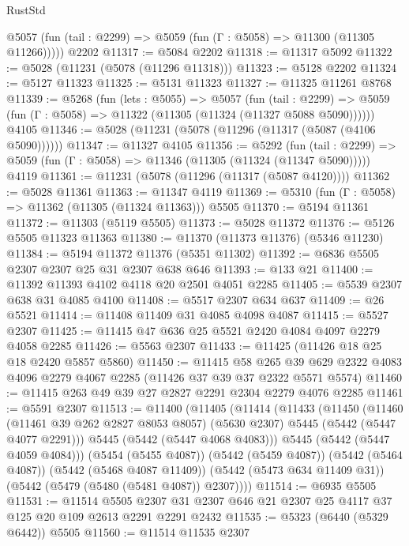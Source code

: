 \begin{lexlean}{RustStd}
\begin{coremodule}
      @5057 (fun (tail : @2299) => @5059 (fun (Γ : @5058) => @11300 (@11305 @11266)))))
    @2202
@11317 := @5084 @2202
@11318 := @11317 @5092
@11322 := @5028 (@11231 (@5078 (@11296 @11318)))
@11323 := @5128 @2202
@11324 := @5127 @11323
@11325 := @5131 @11323
@11327 := @11325 @11261 @8768
@11339 := @5268
    (fun (lets : @5055) =>
    @5057
      (fun (tail : @2299) =>
      @5059 (fun (Γ : @5058) => @11322 (@11305 (@11324 (@11327 @5088 @5090))))))
    @4105
@11346 := @5028 (@11231 (@5078 (@11296 (@11317 (@5087 (@4106 @5090))))))
@11347 := @11327 @4105
@11356 := @5292
    (fun (tail : @2299) => @5059 (fun (Γ : @5058) => @11346 (@11305 (@11324 (@11347 @5090)))))
    @4119
@11361 := @11231 (@5078 (@11296 (@11317 (@5087 @4120))))
@11362 := @5028 @11361
@11363 := @11347 @4119
@11369 := @5310 (fun (Γ : @5058) => @11362 (@11305 (@11324 @11363))) @5505
@11370 := @5194 @11361
@11372 := @11303 (@5119 @5505)
@11373 := @5028 @11372
@11376 := @5126 @5505 @11323 @11363
@11380 := @11370 (@11373 @11376) (@5346 @11230)
@11384 := @5194 @11372 @11376 (@5351 @11302)
@11392 := @6836 @5505 @2307 @2307 @25 @31 @2307 @638 @646
@11393 := @133 @21
@11400 := @11392 @11393 @4102 @4118 @20 @2501 @4051 @2285
@11405 := @5539 @2307 @638 @31 @4085 @4100
@11408 := @5517 @2307 @634 @637
@11409 := @26 @5521
@11414 := @11408 @11409 @31 @4085 @4098 @4087
@11415 := @5527 @2307
@11425 := @11415 @47 @636 @25 @5521 @2420 @4084 @4097 @2279 @4058 @2285
@11426 := @5563 @2307
@11433 := @11425 (@11426 @18 @25 @18 @2420 @5857 @5860)
@11450 := @11415
    @58
    @265
    @39
    @629
    @2322
    @4083
    @4096
    @2279
    @4067
    @2285
    (@11426 @37 @39 @37 @2322 @5571 @5574)
@11460 := @11415 @263 @49 @39 @27 @2827 @2291 @2304 @2279 @4076 @2285
@11461 := @5591 @2307
@11513 := @11400
    (@11405
      (@11414
        (@11433
          (@11450
            (@11460
              (@11461 @39 @262 @2827 @8053 @8057)
              (@5630 @2307)
              @5445
              (@5442 (@5447 @4077 @2291)))
            @5445
            (@5442 (@5447 @4068 @4083)))
          @5445
          (@5442 (@5447 @4059 @4084)))
        (@5454 (@5455 @4087))
        (@5442 (@5459 @4087))
        (@5442 (@5464 @4087))
        (@5442 (@5468 @4087 @11409))
        (@5442 (@5473 @634 @11409 @31))
        (@5442 (@5479 (@5480 (@5481 @4087)) @2307))))
@11514 := @6935 @5505
@11531 := @11514
    @5505
    @2307
    @31
    @2307
    @646
    @21
    @2307
    @25
    @4117
    @37
    @125
    @20
    @109
    @2613
    @2291
    @2291
    @2432
@11535 := @5323 (@6440 (@5329 @6442)) @5505
@11560 := @11514
    @11535
    @2307

\end{coremodule}
\end{lexlean}
